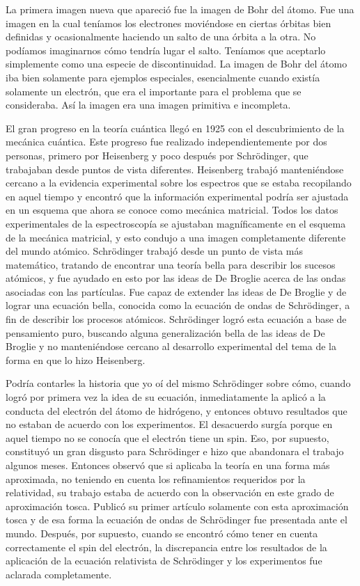 \documentclass[a4paper, 12pt]{article}
\begin{document}
La primera imagen nueva que apareció fue la imagen de Bohr del átomo. Fue una imagen en la cual teníamos los electrones moviéndose en ciertas órbitas bien definidas y ocasionalmente haciendo un salto de una órbita a la otra. No podíamos imaginarnos cómo tendría lugar el salto. Teníamos que aceptarlo simplemente como una especie de discontinuidad. La imagen de Bohr del átomo iba bien solamente para ejemplos especiales, esencialmente cuando existía solamente un electrón, que era el importante para el problema que se consideraba. Así la imagen era una imagen primitiva e incompleta.

El gran progreso en la teoría cuántica llegó en 1925 con el descubrimiento de la mecánica cuántica. Este progreso fue realizado independientemente por dos personas, primero por Heisenberg y poco después por Schrödinger, que trabajaban desde puntos de vista diferentes. Heisenberg trabajó manteniéndose cercano a la evidencia experimental sobre los espectros que se estaba recopilando en aquel tiempo y encontró que la información experimental podría ser ajustada en un esquema que ahora se conoce como mecánica matricial. Todos los datos experimentales de la espectroscopía se ajustaban magníficamente en el esquema de la mecánica matricial, y esto condujo a una imagen completamente diferente del mundo atómico. Schrödinger trabajó desde un punto de vista más matemático, tratando de encontrar una teoría bella para describir los sucesos atómicos, y fue ayudado en esto por las ideas de De Broglie acerca de las ondas asociadas con las partículas. Fue capaz de extender las ideas de De Broglie y de lograr una ecuación bella, conocida como la ecuación de ondas de Schrödinger, a fin de describir los procesos atómicos. Schrödinger logró esta ecuación a base de pensamiento puro, buscando alguna generalización bella de las ideas de De Broglie y no manteniéndose cercano al desarrollo experimental del tema de la forma en que lo hizo Heisenberg.

Podría contarles la historia que yo oí del mismo Schrödinger sobre cómo, cuando logró por primera vez la idea de su ecuación, inmediatamente la aplicó a la conducta del electrón del átomo de hidrógeno, y entonces obtuvo resultados que no estaban de acuerdo con los experimentos. El desacuerdo surgía porque en aquel tiempo no se conocía que el electrón tiene un spin. Eso, por supuesto, constituyó un gran disgusto para Schrödinger e hizo que abandonara el trabajo algunos meses. Entonces observó que si aplicaba la teoría en una forma más aproximada, no teniendo en cuenta los refinamientos requeridos por la relatividad, su trabajo estaba de acuerdo con la observación en este grado de aproximación tosca. Publicó su primer artículo solamente con esta aproximación tosca y de esa forma la ecuación de ondas de Schrödinger fue presentada ante el mundo. Después, por supuesto, cuando se encontró cómo tener en cuenta correctamente el spin del electrón, la discrepancia entre los resultados de la aplicación de la ecuación relativista de Schrödinger y los experimentos fue aclarada completamente.
\end{document}
